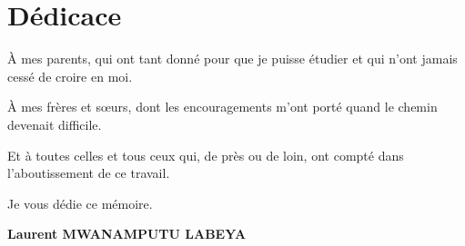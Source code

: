 \chapter*{Dédicace}
\thispagestyle{empty}

\vspace*{\fill}

\begin{center}
  \begin{minipage}{0.8\linewidth}
    \centering
    \itshape

    À mes parents, qui ont tant donné pour que je puisse étudier
    et qui n'ont jamais cessé de croire en moi.

    \bigskip

    À mes frères et sœurs, dont les encouragements m'ont porté
    quand le chemin devenait difficile.

    \bigskip

    Et à toutes celles et tous ceux qui, de près ou de loin,
    ont compté dans l'aboutissement de ce travail.

    \bigskip\bigskip

    Je vous dédie ce mémoire.
  \end{minipage}
\end{center}

\vspace*{\fill}

\begin{flushright}
  \textbf{Laurent MWANAMPUTU LABEYA}
\end{flushright}

\vspace{1cm}